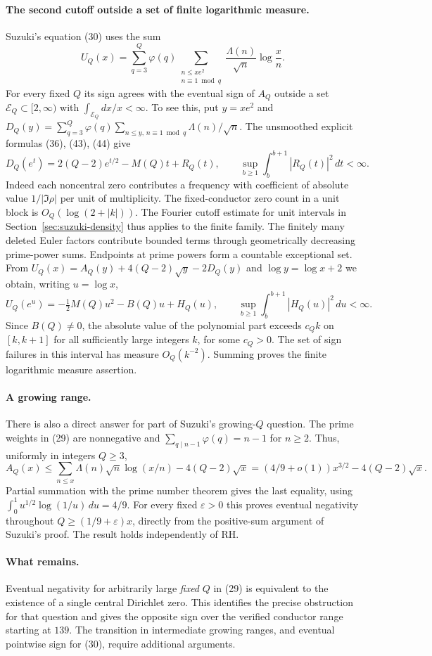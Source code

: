 \paragraph{The second cutoff outside a set of finite logarithmic measure.}
Suzuki's equation (30) uses the sum
\[
 U_Q(x)=\sum_{q=3}^Q\varphi(q)
 \sum_{\substack{n\le xe^2\\n\equiv1\bmod q}}
 \frac{\Lambda(n)}{\sqrt n}\log\frac{x}{n}.
\]
For every fixed $Q$ its sign agrees with the eventual sign of $A_Q$ outside
a set $\mathcal E_Q\subset[2,\infty)$ with
$\int_{\mathcal E_Q}dx/x<\infty$.
To see this, put $y=xe^2$ and
$D_Q(y)=\sum_{q=3}^Q\varphi(q)\sum_{n\le y,\,n\equiv1\bmod q}
\Lambda(n)/\sqrt n$. The unsmoothed explicit formulas (36), (43), (44)
give
\[
 D_Q(e^t)=2(Q-2)e^{t/2}-M(Q)t+R_Q(t),
 \qquad\sup_{b\ge1}\int_b^{b+1}|R_Q(t)|^2\,dt<\infty.
\]
Indeed each noncentral zero contributes a frequency with coefficient of
absolute value $1/|\Im\rho|$ per unit of multiplicity. The fixed-conductor
zero count in a unit block is $O_Q(\log(2+|k|))$. The Fourier cutoff estimate
for unit intervals in Section~\ref{sec:suzuki-density} thus applies to the
finite family. The finitely many deleted Euler factors contribute bounded
terms through geometrically decreasing prime-power sums. Endpoints at
prime powers form a countable exceptional set.
From $U_Q(x)=A_Q(y)+4(Q-2)\sqrt y-2D_Q(y)$ and $\log y=\log x+2$
we obtain, writing $u=\log x$,
\[
 U_Q(e^u)=-\tfrac12M(Q)u^2-B(Q)u+H_Q(u),
 \qquad \sup_{b\ge1}\int_b^{b+1}|H_Q(u)|^2\,du<\infty .
\]
Since $B(Q)\ne0$, the absolute value of the polynomial part exceeds
$c_Q k$ on $[k,k+1]$ for all sufficiently large integers $k$, for some $c_Q>0$.
The set of sign failures in this interval has measure $O_Q(k^{-2})$.
Summing proves the finite logarithmic measure assertion.

\paragraph{A growing range.}
There is also a direct answer for part of Suzuki's growing-$Q$ question.
The prime weights in (29) are nonnegative and
$\sum_{q\mid n-1}\varphi(q)=n-1$ for $n\ge2$. Thus, uniformly in integers $Q\ge3$,
\[
 A_Q(x)\le \sum_{n\le x}\Lambda(n)\sqrt n\log(x/n)-4(Q-2)\sqrt x
 = (4/9+o(1))x^{3/2}-4(Q-2)\sqrt x.
\]
Partial summation with the prime number theorem gives the last equality,
using $\int_0^1 u^{1/2}\log(1/u)\,du=4/9$.
For every fixed $\varepsilon>0$ this proves eventual negativity throughout
$Q\ge(1/9+\varepsilon)x$, directly from the positive-sum argument of
Suzuki's proof. The result holds independently of RH.

\paragraph{What remains.}
Eventual negativity for arbitrarily large \emph{fixed} $Q$ in (29)
is equivalent to the existence of a single central Dirichlet zero.
This identifies the precise obstruction for that question and gives the
opposite sign over the verified conductor range starting at $139$.
The transition in intermediate growing ranges, and eventual pointwise sign for
(30), require additional arguments.
